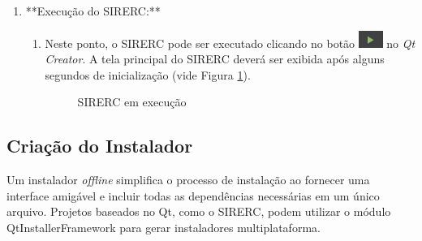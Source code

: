 \documentclass[a4paper,11pt]{article}
\newcommand{\sistema}{\textsf{SIRERC}}
\newcommand{\qtcreator}{\textit{Qt Creator}}
\begin{document}
\begin{enumerate}
	\item **Execução do \sistema{}:**
	\begin{enumerate}
		\item Neste ponto, o \sistema{} pode ser executado clicando no botão \includegraphics[height=1.5em]{images/sirercrun.png} no \qtcreator{}. A tela principal do \sistema{} deverá ser exibida após alguns segundos de inicialização (vide Figura \ref{fig:sirerc}).
		
		\begin{figure}[H]\centering
			\caption{\sistema{} em execução}\label{fig:sirerc}
		\end{figure}
	\end{enumerate}
\end{enumerate}

\subsection{Criação do Instalador}

Um instalador \emph{offline} simplifica o processo de instalação ao fornecer uma interface amigável e incluir todas as dependências necessárias em um único arquivo. Projetos baseados no Qt, como o \sistema{}, podem utilizar o módulo QtInstallerFramework para gerar instaladores multiplataforma.
\end{document}
